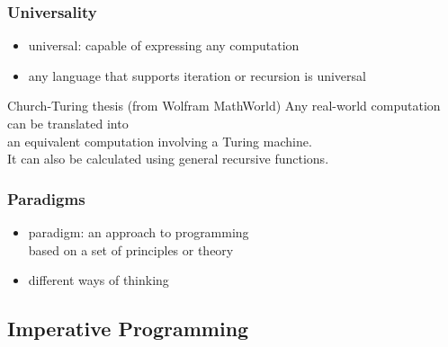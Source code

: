 \documentclass[dvipsnames]{beamer}
\theoremstyle{plain}
\begin{document}
\begin{frame}
  \frametitle{Universality}

  \begin{itemize}
    \item \alert{universal}: capable of expressing any computation
    \item any language that supports iteration or recursion is universal
  \end{itemize}

  \pause
  \medskip
  \begin{block}{Church-Turing thesis (from Wolfram MathWorld)}
    Any real-world computation can be translated into\\
    an equivalent computation involving a Turing machine.\\
    \medskip
    It can also be calculated using general recursive functions.
  \end{block}
\end{frame}

\begin{frame}
  \frametitle{Paradigms}

  \begin{itemize}
    \item \alert{paradigm}: an approach to programming\\
      based on a set of principles or theory
    \item different ways of thinking
  \end{itemize}
\end{frame}

\subsection{Imperative Programming}
\end{document}
